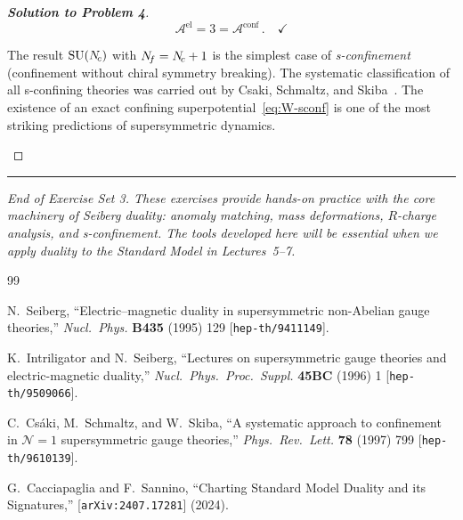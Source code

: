 \documentclass[11pt,a4paper]{article}
\begin{document}
\begin{proof}[\textbf{Solution to Problem 4}]
\[
  \boxed{\mathcal{A}^{\mathrm{el}} = 3
  = \mathcal{A}^{\mathrm{conf}}}\,.
  \quad\checkmark
\]

\begin{remark}
  The result $\mathrm{SU}(N_{\!c})$ with $N_{\!f} = N_{\!c} + 1$ is the simplest case of
  \emph{s-confinement} (confinement without chiral symmetry breaking).
  The systematic classification of all s-confining theories was carried
  out by Csaki, Schmaltz, and Skiba~\cite{CSS1997}.  The existence of an
  exact confining superpotential~\eqref{eq:W-sconf} is one of the most
  striking predictions of supersymmetric dynamics.
\end{remark}

\end{proof}

\bigskip

\begin{center}
\rule{0.6\textwidth}{0.4pt}

\textit{End of Exercise Set 3.  These exercises provide hands-on
practice with the core machinery of Seiberg duality: anomaly matching,
mass deformations, $R$-charge analysis, and s-confinement.
The tools developed here will be essential when we apply duality
to the Standard Model in Lectures~5--7.}
\end{center}


\begin{thebibliography}{99}

  N.~Seiberg,
  ``Electric--magnetic duality in supersymmetric non-Abelian gauge
  theories,''
  \textit{Nucl.~Phys.} \textbf{B435} (1995) 129
  [\texttt{hep-th/9411149}].

  K.~Intriligator and N.~Seiberg,
  ``Lectures on supersymmetric gauge theories and electric-magnetic
  duality,''
  \textit{Nucl.~Phys.~Proc.~Suppl.} \textbf{45BC} (1996) 1
  [\texttt{hep-th/9509066}].

  C.~Cs\'aki, M.~Schmaltz, and W.~Skiba,
  ``A systematic approach to confinement in $\mathcal{N}=1$
  supersymmetric gauge theories,''
  \textit{Phys.~Rev.~Lett.} \textbf{78} (1997) 799
  [\texttt{hep-th/9610139}].

  G.~Cacciapaglia and F.~Sannino,
  ``Charting Standard Model Duality and its Signatures,''
  [\texttt{arXiv:2407.17281}] (2024).

\end{thebibliography}
\end{document}
